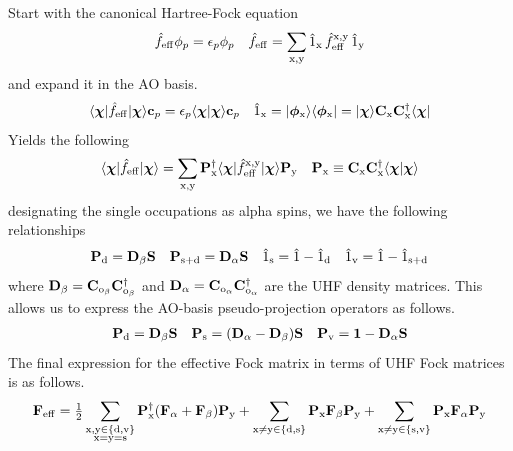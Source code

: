 \documentclass[11pt]{article}
\numberwithin{equation}{section}
\begin{document}
Start with the canonical Hartree-Fock equation
\begin{align}
  \hat{f}_{\mathrm{eff}}
  \phi _p
=
  \epsilon _p
  \phi _p
&&
  \hat{f}_{\mathrm{eff}}
=
  \sum_{\mathrm{x},\mathrm{y}}
  \hat{1}_{\mathrm{x}}
  \,
  \hat{f}_{\mathrm{eff}}^{\mathrm{x},\mathrm{y}}
  \,
  \hat{1}_{\mathrm{y}}
\end{align}
and expand it in the AO basis.
\begin{align}
  \ip{\bm\x|\op{f}_\mr{eff}|\bm\x}
  \bo{c}_p
=
  \ev_p
  \ip{\bm\x|\bm\x}
  \bo{c}_p
&&
  \op{1}_\mr{x}
=
  \kt{\bm\f_\mr{x}}
  \br{\bm\f_\mr{x}}
=
  \kt{\bm\x}
  \bo{C}_\mr{x}
  \bo{C}_\mr{x}\dg
  \br{\bm\x}
\end{align}
Yields the following
\begin{align}
  \ip{\bm\x|\op{f}_\mr{eff}|\bm\x}
=
  \sum_{\mr{x},\mr{y}}
  \bo{P}_\mr{x}\dg
  \ip{\bm\x|\op{f}_\mr{eff}^\mr{x,y}|\bm\x}
  \bo{P}_\mr{y}
&&
  \bo{P}_\mr{x}
\equiv
  \bo{C}_\mr{x}\bo{C}_\mr{x}\dg
  \ip{\bm\x|\bm\x}
\end{align}
designating the single occupations as alpha spins, we have the following relationships
\begin{align}
  \mathbf{P}_{\mathrm{d}}
=
  \mathbf{D}_{\beta }\mathbf{S}
&&
  \mathbf{P}_{\mathrm{s+d}}
=
  \mathbf{D}_{\alpha }\mathbf{S}
&&
  \hat{1}_{\mathrm{s}}
=
  \hat{1}
-
  \hat{1}_{\mathrm{d}}
&&
  \hat{1}_{\mathrm{v}}
=
  \hat{1}
-
  \hat{1}_{\mathrm{s+d}}
\end{align}
where
$
  \mathbf{D}_{\beta }
=
  \mathbf{C}_{\mathrm{o}_{\beta }}
  \mathbf{C}_{\mathrm{o}_{\beta }}^\dagger
$
and
$
  \mathbf{D}_{\alpha }
=
  \mathbf{C}_{\mathrm{o}_{\alpha }}
  \mathbf{C}_{\mathrm{o}_{\alpha }}^\dagger
$
are the UHF density matrices.
This allows us to express the AO-basis pseudo-projection operators as follows.
\begin{align}
  \mathbf{P}_{\mathrm{d}}
=
  \mathbf{D}_{\beta }
  \mathbf{S}
&&
  \mathbf{P}_{\mathrm{s}}
=
  (\mathbf{D}_{\alpha } - \mathbf{D}_{\beta })
  \mathbf{S}
&&
  \mathbf{P}_{\mathrm{v}}
=
  \mathbf{1}
-
  \mathbf{D}_{\alpha }
  \mathbf{S}
\end{align}
The final expression for the effective Fock matrix in terms of UHF Fock matrices is as follows.
\begin{align}
  \mathbf{F}_{\mathrm{eff}}
=
  \tfrac{1}{2}
  \sum_{
    \substack{
      \mathrm{x},\mathrm{y}\in\{\mathrm{d},\mathrm{v}\} \\
      \mathrm{x} = \mathrm{y} = \mathrm{s}
    }
  }
  \mathbf{P}_{\mathrm{x}}^\dagger
  (\mathbf{F}_{\alpha } + \mathbf{F}_{\beta })
  \mathbf{P}_{\mathrm{y}}
+
  \sum_{\mathrm{x}\neq\mathrm{y}\in\{\mathrm{d},\mathrm{s}\}}
  \mathbf{P}_{\mathrm{x}}
  \mathbf{F}_{\beta }
  \mathbf{P}_{\mathrm{y}}
+
  \sum_{\mathrm{x}\neq\mathrm{y}\in\{\mathrm{s},\mathrm{v}\}}
  \mathbf{P}_{\mathrm{x}}
  \mathbf{F}_{\alpha }
  \mathbf{P}_{\mathrm{y}}
\end{align}
\end{document}
